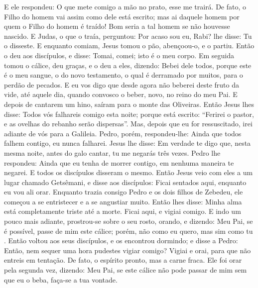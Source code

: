 {  E ele respondeu: O que mete comigo a mão no prato, esse me trairá.
  De fato, o Filho do homem vai assim como dele está escrito; mas ai daquele homem por quem o Filho do homem é traído! Bom seria a tal homem se não houvesse nascido.
  E Judas, o que o traía, perguntou: Por acaso sou eu, Rabi?
{} lhe disse: Tu o disseste.
  E enquanto comiam, Jesus tomou o pão, abençoou-o, e o partiu. Então o deu aos discípulos, e disse: Tomai, comei; isto é o meu corpo.
  Em seguida tomou o cálice, deu graças, e o deu a eles, dizendo: Bebei dele todos,
  porque este é o meu sangue, o
{} do novo testamento,
 o qual é derramado por muitos, para o perdão de pecados.
  E eu vos digo que desde agora não beberei deste fruto da vide, até aquele dia, quando convosco o beber, novo, no reino do meu Pai.
  E depois de cantarem um hino,
 saíram para o monte das Oliveiras.
  Então Jesus lhes disse: Todos vós falhareis comigo
 esta noite; porque está escrito: “Ferirei o pastor, e as ovelhas do rebanho serão dispersas”.
  Mas, depois que eu for ressuscitado, irei adiante de vós para a Galileia.
  Pedro, porém, respondeu-lhe: Ainda que todos falhem contigo, eu nunca falharei.
  Jesus lhe disse: Em verdade te digo que, nesta mesma noite, antes do galo cantar, tu me negarás três vezes.
  Pedro lhe respondeu: Ainda que eu tenha de morrer contigo, em nenhuma maneira te negarei. E todos os discípulos disseram o mesmo.
  Então Jesus veio com eles a um lugar chamado Getsêmani, e disse aos discípulos: Ficai sentados aqui, enquanto eu vou ali orar.
  Enquanto trazia consigo Pedro e os dois filhos de Zebedeu, ele começou a se entristecer e a se angustiar muito.
  Então lhes disse: Minha alma está completamente triste até a morte. Ficai aqui, e vigiai comigo.
  E indo um pouco mais adiante, prostrou-se sobre o seu rosto, orando, e dizendo: Meu Pai, se é possível, passe de mim este cálice; porém, não
{} como eu quero, mas sim como tu
{} .
  Então voltou aos seus discípulos, e os encontrou dormindo; e disse a Pedro: Então, nem sequer uma hora pudestes vigiar comigo?
  Vigiai e orai, para que não entreis em tentação. De fato, o espírito
{} pronto, mas a carne
{} fraca.
  Ele foi orar pela segunda vez, dizendo: Meu Pai, se este cálice não pode passar de mim sem que eu o beba, faça-se a tua vontade.
}

